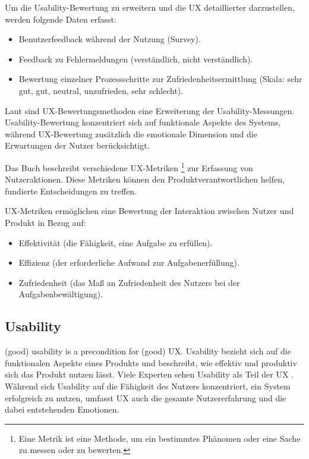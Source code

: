 \documentclass[12pt,oneside]{article}
\begin{document}
Um die Usability-Bewertung zu erweitern und die UX detaillierter darzustellen, werden folgende Daten erfasst:

\begin{itemize} \item Benutzerfeedback während der Nutzung (Survey). \item Feedback zu Fehlermeldungen (verständlich, nicht verständlich). \item Bewertung einzelner Prozessschritte zur Zufriedenheitsermittlung (Skala: sehr gut, gut, neutral, unzufrieden, sehr schlecht). \end{itemize}

Laut \cite{GOISTAI} sind UX-Bewertungsmethoden eine Erweiterung der Usability-Messungen. Usability-Bewertung konzentriert sich auf funktionale Aspekte des Systems, während UX-Bewertung zusätzlich die emotionale Dimension und die Erwartungen der Nutzer berücksichtigt.

Das Buch \cite{measuring} beschreibt verschiedene UX-Metriken \footnote{Eine Metrik ist eine Methode, um ein bestimmtes Phänomen oder eine Sache zu messen oder zu bewerten.} zur Erfassung von Nutzeraktionen. Diese Metriken können den Produktverantwortlichen helfen, fundierte Entscheidungen zu treffen.

UX-Metriken ermöglichen eine Bewertung der Interaktion zwischen Nutzer und Produkt in Bezug auf:

\begin{itemize} \item Effektivität (die Fähigkeit, eine Aufgabe zu erfüllen). \item Effizienz (der erforderliche Aufwand zur Aufgabenerfüllung). \item Zufriedenheit (das Maß an Zufriedenheit des Nutzers bei der Aufgabenbewältigung). \end{itemize}

\subsection{Usability}
 (good) usability is a precondition
for (good) UX.\cite{glanznig}
Usability bezieht sich auf die funktionalen Aspekte eines Produkts und beschreibt, wie effektiv und produktiv sich das Produkt nutzen lässt. Viele Experten sehen Usability als Teil der UX \cite{GOISTAI}. Während sich Usability auf die Fähigkeit des Nutzers konzentriert, ein System erfolgreich zu nutzen, umfasst UX auch die gesamte Nutzererfahrung und die dabei entstehenden Emotionen.
\end{document}
